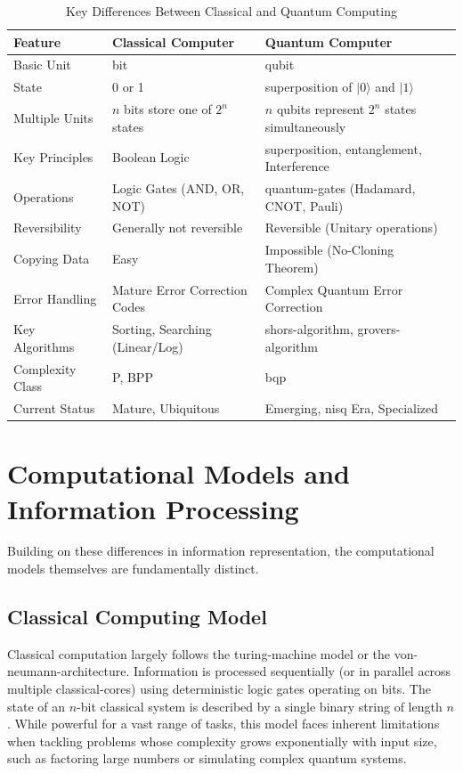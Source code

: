 \begin{table}[h!]
    \centering
    \caption{Key Differences Between Classical and Quantum Computing}
    \label{tab:classical_vs_quantum_summary_rev}
    \begin{tabular}{@{}lll@{}}
        \toprule
        \textbf{Feature} & \textbf{Classical Computer} & \textbf{Quantum Computer} \\
        \midrule
        Basic Unit & \Gls{bit} & \Gls{qubit} \\
        State & 0 or 1 & \Gls{superposition} of $|0\rangle$ and $|1\rangle$ \\
        Multiple Units & $n$ \glspl{bit} store one of $2^n$ states & $n$ \glspl{qubit} represent $2^n$ states simultaneously \\
        Key Principles & Boolean Logic & \Gls{superposition}, \Gls{entanglement}, Interference \\
        Operations & Logic Gates (AND, OR, NOT) & \Glspl{quantum-gate} (Hadamard, CNOT, Pauli) \\
        Reversibility & Generally not reversible & Reversible (Unitary operations) \\
        Copying Data & Easy & Impossible (No-Cloning Theorem) \\
        Error Handling & Mature Error Correction Codes & Complex Quantum Error Correction\\
        Key Algorithms & Sorting, Searching (Linear/Log) & \Gls{shors-algorithm}, \Gls{grovers-algorithm}\\
        Complexity Class & P, BPP & \Gls{bqp} \\
        Current Status & Mature, Ubiquitous & Emerging, \Gls{nisq} Era, Specialized \\
        \bottomrule
    \end{tabular}
\end{table}

\section{Computational Models and Information Processing}\label{sec:computational_models_rev}

Building on these differences in information representation, the computational models themselves are fundamentally distinct.

\subsection{Classical Computing Model}\label{subsec:classical_rev}
Classical computation largely follows the \gls{turing-machine} model or the \gls{von-neumann-architecture}. Information is processed sequentially (or in parallel across multiple \glspl{classical-core}) using deterministic logic gates operating on \glspl{bit}. The state of an $n$-\gls{bit} classical system is described by a single binary string of length $n$. While powerful for a vast range of tasks, this model faces inherent limitations when tackling problems whose complexity grows exponentially with input size, such as factoring large numbers or simulating complex quantum systems.
\newpage

